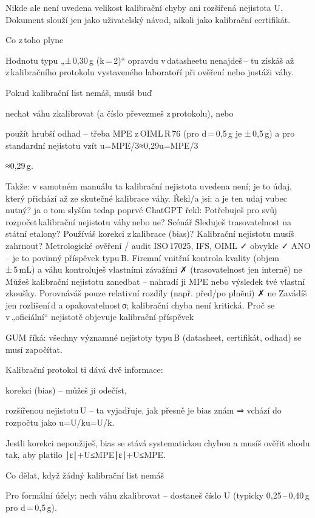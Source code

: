 {Nikde ale není uvedena velikost kalibrační chyby ani rozšířená nejistota U. Dokument slouží jen jako uživatelský návod, nikoli jako kalibrační certifikát. ​

Co z toho plyne

    Hodnotu typu „± 0,30 g (k = 2)“ opravdu v datasheetu nenajdeš – tu získáš až z kalibračního protokolu vystaveného laboratoří při ověření nebo justáži váhy.

    Pokud kalibrační list nemáš, musíš buď

        nechat váhu zkalibrovat (a číslo převezmeš z protokolu), nebo

        použít hrubší odhad – třeba MPE z OIML R 76 (pro d = 0,5 g je ± 0,5 g) a pro standardní nejistotu vzít u=MPE/3≈0,29u=MPE/3

            ​≈0,29 g.

Takže: v samotném manuálu ta kalibrační nejistota uvedena není; je to údaj, který přichází až ze skutečné kalibrace váhy.
Řekl/a jsi:
a je ten udaj vubec nutný? ja o tom slyším tedap poprvé
ChatGPT řekl:
Potřebuješ pro svůj rozpočet kalibrační nejistotu váhy nebo ne?
Scénář	Sleduješ trasovatelnost na státní etalony?	Používáš korekci z kalibrace (bias)?	Kalibrační nejistotu musíš zahrnout?
Metrologické ověření / audit ISO 17025, IFS, OIML	✓	obvykle ✓	ANO – je to povinný příspěvek typu B.
Firemní vnitřní kontrola kvality (objem ± 5 mL) a váhu kontroluješ vlastními závažími	✗ (trasovatelnost jen interně)	ne	Můžeš kalibrační nejistotu zanedbat – nahradí ji MPE nebo výsledek tvé vlastní zkoušky.
Porovnáváš pouze relativní rozdíly (např. před/po plnění)	✗	ne	Zavádíš jen rozlišení d a opakovatelnost σ; kalibrační chyba není kritická.
Proč se v „oficiální“ nejistotě objevuje kalibrační příspěvek

    GUM říká: všechny významné nejistoty typu B (datasheet, certifikát, odhad) se musí započítat.

    Kalibrační protokol ti dává dvě informace:

        korekci (bias) – můžeš ji odečíst,

        rozšířenou nejistotu U – ta vyjadřuje, jak přesně je bias znám ⇒ vchází do rozpočtu jako u=U/ku=U/k.

    Jestli korekci nepoužiješ, bias se stává systematickou chybou a musíš ověřit shodu tak, aby platilo ∣ε∣+U≤MPE∣ε∣+U≤MPE.

Co dělat, když žádný kalibrační list nemáš

    Pro formální účely: nech váhu zkalibrovat – dostaneš číslo U (typicky 0,25 – 0,40 g pro d = 0,5 g).

}
